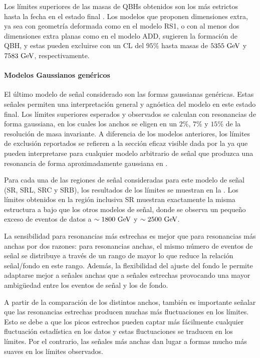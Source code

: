 Los límites superiores de las masas de \acp{QBH} obtenidos son los más estrictos hasta la fecha en el estado final \gammajet. Los modelos que proponen dimensiones extra, ya sea con geometría deformada como en el modelo RS1, o con al menos dos dimensiones extra planas como en el modelo ADD, sugieren la formación de \ac{QBH}, y estas pueden excluirse con un \ac{CL} del \(95\%\) hasta masas de \(5355~\text{GeV}\) y \(7583~\text{GeV}\), respectivamente.




\paragraph{Modelos Gaussianos genéricos}
\label{paragraph:results:results:bkgsig:results:gaus}


El último modelo de señal considerado son las formas gaussianas genéricas. Estas señales permiten una interpretación general y agnóstica del modelo en este estado final. Los límites superiores esperados y observados se calculan con resonancias de forma gaussiana, en los cuales los anchos se eligen en un \(2\%\), \(7\%\) y \(15\%\) de la resolución de masa invariante. A diferencia de los modelos anteriores, los límites de exclusión reportados se refieren a la sección eficaz visible dada por la \Eqn{\ref{eq:results:results:bkgsig:results:visible_xs}} ya que pueden interpretarse para cualquier modelo arbitrario de señal que produzca una resonancia \gammajet de forma aproximadamente gaussiana en \myj.

Para cada una de las regiones de señal consideradas para este modelo de señal (SR, SRL, SRC y SRB), los resultados de los límites se muestran en la \Fig{\ref{fig:results:results:bkgsig:results:gaus:limits}}.
Los límites obtenidos en la región inclusiva SR muestran exactamente la misma estructura a bajo \myj que los otros modelos de señal, donde se observa un pequeño exceso de eventos de datos a \(\sim 1800~\text{GeV}\) y \(\sim 2500~\text{GeV}\).

La sensibilidad para resonancias más estrechas es mejor que para resonancias más anchas por dos razones: para resonancias anchas, el mismo número de eventos de señal se distribuye a través de un rango de \myj mayor lo que reduce la relación señal/fondo en este rango. Además, la flexibilidad del ajuste del fondo le permite adaptarse mejor a señales anchas que a señales estrechas provocando una mayor ambigüedad entre los eventos de señal y los de fondo.

A partir de la comparación de los distintos anchos, también es importante señalar que las resonancias estrechas producen muchas más fluctuaciones en los límites. Esto se debe a que los picos estrechos pueden captar más fácilmente cualquier fluctuación estadística en los datos y estas fluctuaciones se traducen en los límites. Por el contrario, las señales más anchas dan lugar a formas mucho más suaves en los límites observados.

